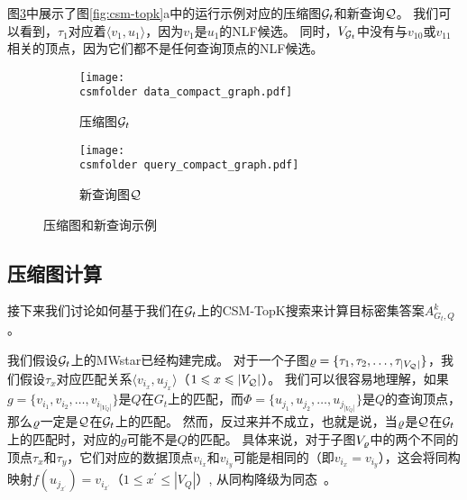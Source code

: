 图\ref{fig:compact}中展示了图\ref{fig:csm-topk}a中的运行示例对应的压缩图$\mathcal{G}_t$和新查询$\mathcal{Q}$。
我们可以看到，$\tau_1$对应着$\langle v_1, u_1 \rangle$，因为$v_1$是$u_1$的NLF候选。
同时，$V_{\mathcal{G}_t}$中没有与$v_{10}$或$v_{11}$相关的顶点，因为它们都不是任何查询顶点的NLF候选。

\begin{figure}[h!]
\def\wscorevone{0.62}
\centering
\begin{subfigure}[t]{\wscorevone\linewidth}
\centering
\resizebox{\linewidth}{!}
{
\texttt{[image: \\csmfolder data\_compact\_graph.pdf]}
}
\caption{压缩图$\mathcal{G}_t$}
\label{fig:data_compact_graph}
\end{subfigure}
\begin{subfigure}[t]{0.35\linewidth}
\centering
\resizebox{\linewidth}{!}
{
\texttt{[image: \\csmfolder query\_compact\_graph.pdf]}
}
\caption{新查询图$\mathcal{Q}$}
\label{fig:query_compact_graph}
\end{subfigure}
\caption{压缩图和新查询示例}
\label{fig:compact}
\end{figure}


\subsection{压缩图计算}
接下来我们讨论如何基于我们在$\mathcal{G}_t$上的CSM-TopK搜索来计算目标密集答案$A_{G_t, Q}^k$。

我们假设$\mathcal{G}_t$上的MWstar已经构建完成。
对于一个子图$\varrho = \{\tau_1, \tau_2, \dots, \tau_{|V_{\mathcal{Q}}|}\}$，我们假设$\tau_x$对应匹配关系$\langle v_{i_x}, u_{j_x} \rangle$（$1 \leqslant x \leqslant |V_{\mathcal{Q}}|$）。
我们可以很容易地理解，如果$g = \{v_{i_1}, v_{i_2}, \dots, v_{i_{|V_Q|}}\}$是$Q$在$G_t$上的匹配，而$\Phi = \{u_{j_1}, u_{j_2}, \dots, u_{j_{|V_Q|}}\}$是$Q$的查询顶点，那么$\varrho$一定是$\mathcal{Q}$在$\mathcal{G}_t$上的匹配。
然而，反过来并不成立，也就是说，当$\varrho$是$\mathcal{Q}$在$\mathcal{G}_t$上的匹配时，对应的$g$可能不是$Q$的匹配。
具体来说，对于子图$V_{\varrho}$中的两个不同的顶点$\tau_x$和$\tau_y$，它们对应的数据顶点$v_{i_x}$和$v_{i_y}$可能是相同的（即$v_{i_x} = v_{i_y}$），这会将同构映射$f(u_{j_{x^\prime}}) = v_{i_{x^\prime}}$（$1 \leq x^\prime \leq |V_Q|$）, 从同构降级为同态~\cite{homomorphism-DBLP:conf/soda/CyganFGKMPS16}。


